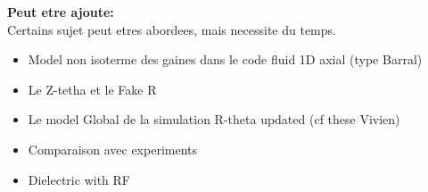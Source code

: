 \vspace{2em}
{\bf Peut etre ajoute:}\\
Certains sujet peut etres abordees, mais necessite du temps.
\begin{itemize}
  \item Model non isoterme des gaines dans le code fluid 1D axial (type Barral)
  \item Le Z-tetha et le Fake R
  \item Le model Global de la simulation R-theta updated (cf these Vivien)
  \item Comparaison avec experiments
  \item Dielectric with RF
\end{itemize}
%
%
%
%

%
%
%
%
%
%
%
%
